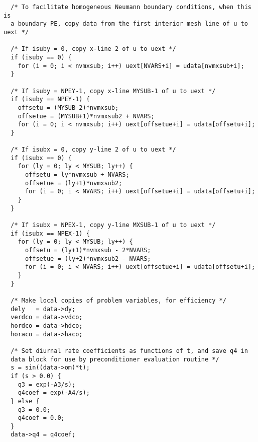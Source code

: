 \begin{verbatim}
  /* To facilitate homogeneous Neumann boundary conditions, when this is
  a boundary PE, copy data from the first interior mesh line of u to uext */

  /* If isuby = 0, copy x-line 2 of u to uext */
  if (isuby == 0) {
    for (i = 0; i < nvmxsub; i++) uext[NVARS+i] = udata[nvmxsub+i];
  }

  /* If isuby = NPEY-1, copy x-line MYSUB-1 of u to uext */
  if (isuby == NPEY-1) {
    offsetu = (MYSUB-2)*nvmxsub;
    offsetue = (MYSUB+1)*nvmxsub2 + NVARS;
    for (i = 0; i < nvmxsub; i++) uext[offsetue+i] = udata[offsetu+i];
  }

  /* If isubx = 0, copy y-line 2 of u to uext */
  if (isubx == 0) {
    for (ly = 0; ly < MYSUB; ly++) {
      offsetu = ly*nvmxsub + NVARS;
      offsetue = (ly+1)*nvmxsub2;
      for (i = 0; i < NVARS; i++) uext[offsetue+i] = udata[offsetu+i];
    }
  }

  /* If isubx = NPEX-1, copy y-line MXSUB-1 of u to uext */
  if (isubx == NPEX-1) {
    for (ly = 0; ly < MYSUB; ly++) {
      offsetu = (ly+1)*nvmxsub - 2*NVARS;
      offsetue = (ly+2)*nvmxsub2 - NVARS;
      for (i = 0; i < NVARS; i++) uext[offsetue+i] = udata[offsetu+i];
    }
  }

  /* Make local copies of problem variables, for efficiency */
  dely   = data->dy;
  verdco = data->vdco;
  hordco = data->hdco;
  horaco = data->haco;

  /* Set diurnal rate coefficients as functions of t, and save q4 in 
  data block for use by preconditioner evaluation routine */
  s = sin((data->om)*t);
  if (s > 0.0) {
    q3 = exp(-A3/s);
    q4coef = exp(-A4/s);
  } else {
    q3 = 0.0;
    q4coef = 0.0;
  }
  data->q4 = q4coef;


\end{verbatim}
